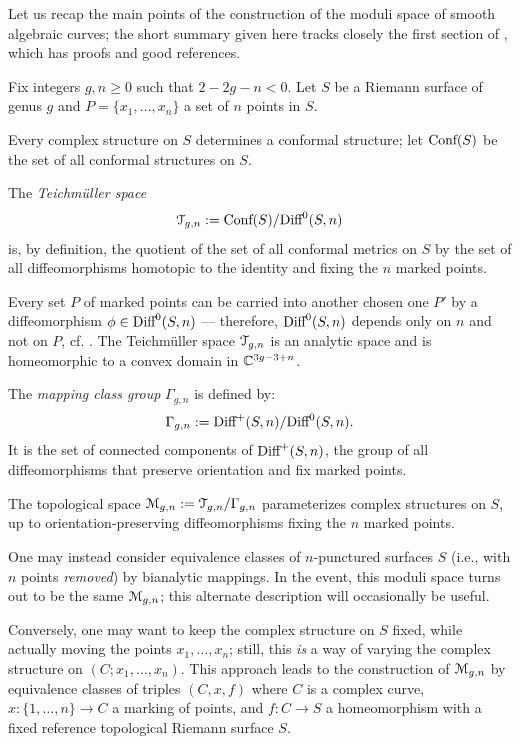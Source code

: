 Let us recap the main points of the construction of the moduli space
of smooth algebraic curves; the short summary given here tracks
closely the first section of \cite{looijenga;cellular-decomposition},
which has proofs and good references.

Fix integers $g,n\geq0$ such that $2 -2g - n < 0$. Let $S$ be a Riemann
surface of genus $g$ and $P = \{ x_1, \ldots, x_n \}$ a set of $n$ points
in $S$.

Every complex structure  on $S$ determines a conformal structure; let
$\text{\rm Conf}(S)$ be the set of all conformal structures on $S$. 
\begin{definition}\label{dfn:teichmuller}
  The \emph{Teichm{\"u}ller space}
  \begin{equation*}
    \mathcal{T}_{g,n} := \text{\rm Conf}(S) / \textrm{Diff}^0(S, n)
  \end{equation*}
  is, by definition, the quotient of the set of all conformal metrics on
  $S$ by the set of all diffeomorphisms homotopic to the identity and
  fixing the $n$ marked points.
\end{definition}
Every set $P$ of marked points can be carried into another chosen one
$P'$ by a diffeomorphism $\phi \in \textrm{Diff}^0(S, n)$ --- therefore,
$\textrm{Diff}^0(S, n)$ depends only on $n$ and not on $P$, cf.
\cite{krushkal;riemann-surfaces}. The Teichm{\"u}ller space $\mathcal{T}_{g,n}$ is
an analytic space and is homeomorphic to a convex domain in $\mathbb{C}^{3g -
  3 + n}$.

\begin{definition}\label{dfn:mapping-class-group}
  The \emph{mapping class group} $\Gamma_{g,n}$ is defined by:
  \begin{equation*}
    \Gamma_{g,n} := \textrm{Diff}^+ (S, n) / \textrm{Diff}^0(S, n).
  \end{equation*}
  It is the set of connected components of $\textrm{Diff}^+(S, n)$, the group
  of all diffeomorphisms that preserve orientation and fix marked
  points.
\end{definition}

The topological space $\mathcal{M}_{g,n} := \mathcal{T}_{g,n} / \Gamma_{g,n}$ parameterizes
complex structures on $S$, up to orientation-preserving
diffeomorphisms fixing the $n$ marked points.
\begin{remark}
  \label{rem:moduli-punctured}
  One may instead consider equivalence classes of $n$-punctured
  surfaces $S$ (i.e., with $n$ points \emph{removed}) by bianalytic
  mappings. In the event, this moduli space turns out to be the same
  $\mathcal{M}_{g,n}$; this alternate description will occasionally be
  useful.
\end{remark}
\begin{remark}
  \label{rem:moduli-with-reference}
  Conversely, one may want to keep the complex structure on $S$ fixed,
  while actually moving the points $x_1, \ldots, x_n$; still, this
  \emph{is} a way of varying the complex structure on $(C; x_1, \dots,
  x_n)$. This approach leads to the construction of $\mathcal{M}_{g,n}$ by
  equivalence classes of triples $(C, x, f)$ where $C$ is a complex
  curve, $x: \{1, \ldots, n\} \longrightarrow C$ a marking of points, and $f: C \to S$ a
  homeomorphism with a fixed reference topological Riemann surface
  $S$.
\end{remark}

